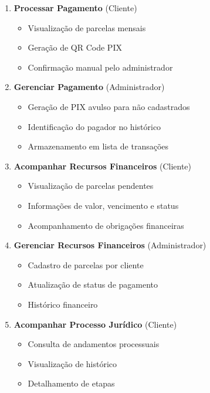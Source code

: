 \begin{enumerate}[leftmargin=*]
    \item \textbf{Processar Pagamento} (Cliente)
    \begin{itemize}
        \item Visualização de parcelas mensais
        \item Geração de QR Code PIX
        \item Confirmação manual pelo administrador
    \end{itemize}
    
    \item \textbf{Gerenciar Pagamento} (Administrador)
    \begin{itemize}
        \item Geração de PIX avulso para não cadastrados
        \item Identificação do pagador no histórico
        \item Armazenamento em lista de transações
    \end{itemize}

    \item \textbf{Acompanhar Recursos Financeiros} (Cliente)
    \begin{itemize}
        \item Visualização de parcelas pendentes
        \item Informações de valor, vencimento e status
        \item Acompanhamento de obrigações financeiras
    \end{itemize}

    \item \textbf{Gerenciar Recursos Financeiros} (Administrador)
    \begin{itemize}
        \item Cadastro de parcelas por cliente
        \item Atualização de status de pagamento
        \item Histórico financeiro
    \end{itemize}
    
    \item \textbf{Acompanhar Processo Jurídico} (Cliente)
    \begin{itemize}
        \item Consulta de andamentos processuais
        \item Visualização de histórico
        \item Detalhamento de etapas
    \end{itemize}
    

\end{enumerate}
